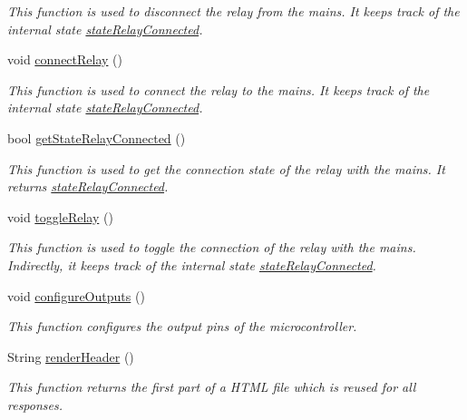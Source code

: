 \begin{DoxyCompactItemize}
\begin{DoxyCompactList}\small\item\em This function is used to disconnect the relay from the mains. It keeps track of the internal state \hyperlink{WIFIOnOff_8ino_a48a5ee80a30c37768bf1e198f1ee5692}{state\-Relay\-Connected}. \end{DoxyCompactList}\item 
void \hyperlink{WIFIOnOff_8ino_a6eda13f766d5d36ba8bcbe7c252c2ab8}{connect\-Relay} ()
\begin{DoxyCompactList}\small\item\em This function is used to connect the relay to the mains. It keeps track of the internal state \hyperlink{WIFIOnOff_8ino_a48a5ee80a30c37768bf1e198f1ee5692}{state\-Relay\-Connected}. \end{DoxyCompactList}\item 
bool \hyperlink{WIFIOnOff_8ino_aefabc9bd763a51753669e6c249140abc}{get\-State\-Relay\-Connected} ()
\begin{DoxyCompactList}\small\item\em This function is used to get the connection state of the relay with the mains. It returns \hyperlink{WIFIOnOff_8ino_a48a5ee80a30c37768bf1e198f1ee5692}{state\-Relay\-Connected}. \end{DoxyCompactList}\item 
void \hyperlink{WIFIOnOff_8ino_a2d92a759a6fa273c581f3fa4243fa1d9}{toggle\-Relay} ()
\begin{DoxyCompactList}\small\item\em This function is used to toggle the connection of the relay with the mains. Indirectly, it keeps track of the internal state \hyperlink{WIFIOnOff_8ino_a48a5ee80a30c37768bf1e198f1ee5692}{state\-Relay\-Connected}. \end{DoxyCompactList}\item 
void \hyperlink{WIFIOnOff_8ino_a4b7676f0d3c07948850fd833023d7783}{configure\-Outputs} ()
\begin{DoxyCompactList}\small\item\em This function configures the output pins of the microcontroller. \end{DoxyCompactList}\item 
String \hyperlink{WIFIOnOff_8ino_a1ec8a91d3b174c2cfee9eaf852f11c1e}{render\-Header} ()
\begin{DoxyCompactList}\small\item\em This function returns the first part of a H\-T\-M\-L file which is reused for all responses. \end{DoxyCompactList}\item 

\end{DoxyCompactItemize}
